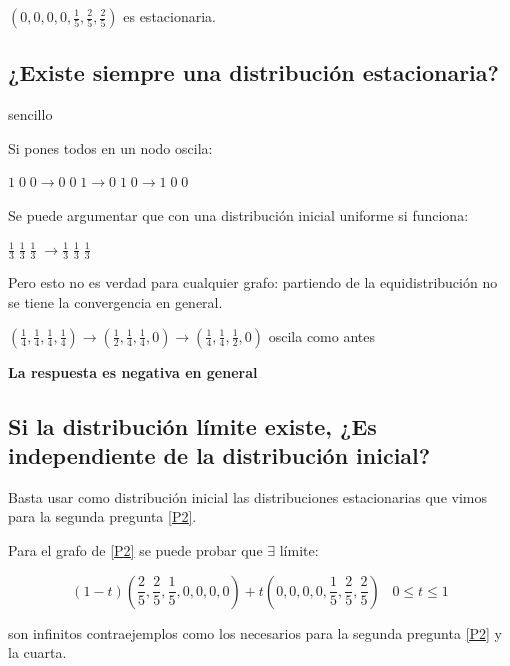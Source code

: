 $(0, 0, 0, 0, \frac{1}{5}, \frac{2}{5}, \frac{2}{5})$ es estacionaria.


\subsection{¿Existe siempre una distribución estacionaria?}

\begin{example}{sencillo}

	\begin{center}
		\centering
	\end{center}

	Si pones todos en un nodo oscila:

	$1\; 0\; 0 \rightarrow 0\; 0\; 1 \rightarrow 0\; 1\; 0 \rightarrow 1\; 0\; 0$

	Se puede argumentar que con una distribución inicial uniforme si funciona:

	$\frac{1}{3} \; \frac{1}{3} \; \frac{1}{3} \; \rightarrow \frac{1}{3} \; \frac{1}{3} \; \frac{1}{3} \; $

	Pero esto no es verdad para cualquier grafo: partiendo de la equidistribución no se tiene la convergencia en general.

	\begin{center}
		\centering
	\end{center}
	

	$(\frac{1}{4},\frac{1}{4},\frac{1}{4},\frac{1}{4}) \rightarrow (\frac{1}{2},\frac{1}{4},\frac{1}{4}, 0) \rightarrow (\frac{1}{4},\frac{1}{4},\frac{1}{2},0)$ oscila como antes

	\textbf{La respuesta es negativa en general}

\end{example}


\subsection {Si la distribución límite existe, ¿Es independiente de la distribución inicial?}


Basta usar como distribución inicial las distribuciones estacionarias que vimos para la segunda pregunta \ref{P2}.

\begin{obs}

Para el grafo de \ref{P2} se puede probar que $\exists$ límite:

$$(1-t)(\frac{2}{5},\frac{2}{5},\frac{1}{5},0,0,0,0) + t (0,0,0,0,\frac{1}{5},\frac{2}{5},\frac{2}{5}) \;\;\; 0 \leq t \leq 1 $$

son infinitos contraejemplos como los necesarios para la segunda pregunta \ref{P2} y la cuarta.

\end{obs}


